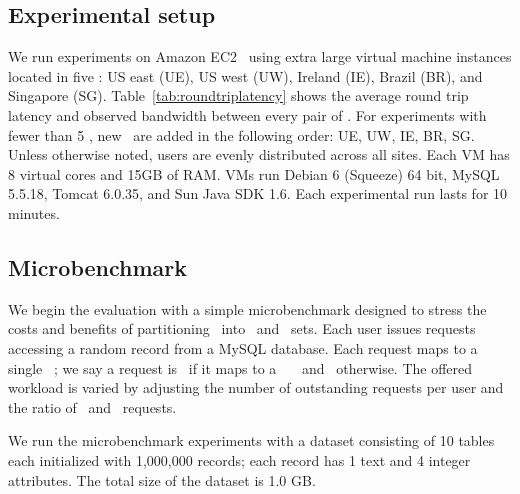 \subsection{Experimental setup} 

We run experiments on Amazon EC2~\cite{AmazonEC2} using extra large virtual
machine instances located in five \dcs: US east (UE), US west (UW),
Ireland (IE), Brazil (BR), and Singapore (SG).
Table~\ref{tab:roundtriplatency} shows the average round trip latency
and observed bandwidth between every pair of \dcs.  For experiments
with fewer than 5 \dcs, new \dcs\ are added in the following order:
UE, UW, IE, BR, SG.  Unless otherwise noted, users are evenly
distributed across all sites.  Each VM has 8 virtual cores and 15GB of
RAM.  VMs run Debian 6 (Squeeze) 64 bit, MySQL 5.5.18, Tomcat 6.0.35,
and Sun Java SDK 1.6. Each experimental run lasts for 10 minutes.

\subsection{Microbenchmark}
\label{sect:micro}

We begin the evaluation with a simple microbenchmark
  designed to stress the costs and benefits of partitioning
  \operations\ into \red\ and \blue\ sets.  Each user issues requests
  accessing a random record from a MyS\-QL database. Each
  request maps to a single \shadow\ \operation; we say a
  request is \blue\ if it maps to a \blue\ \shadow\ \operation\ and
  \red\ otherwise.  The offered workload is varied by adjusting the
  number of outstanding requests per user and the ratio of \red\ and
  \blue\ requests.

We run the microbenchmark experiments with a dataset consisting of 10
tables each initialized with 1,000,000 records; each record has 1 text
and 4 integer attributes.  The total size of the dataset is 1.0
GB. 

